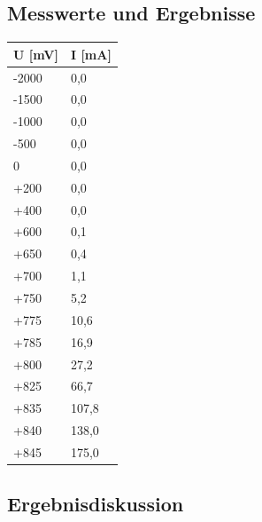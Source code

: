 \documentclass{scrartcl}
\begin{document}
\subsection{Messwerte und Ergebnisse}

\begin{table}[H]
\begin{center}
\begin{tabular}{l|l}
U [mV]   &   I [mA] \\
\hline
-2000   &     0,0 \\
-1500   &     0,0 \\
-1000   &     0,0 \\
-500    &     0,0 \\
    0   &     0,0 \\
+200    &     0,0 \\
+400    &     0,0 \\
+600    &     0,1 \\
+650    &     0,4 \\
+700    &     1,1 \\
+750    &     5,2 \\
+775    &    10,6 \\
+785    &    16,9 \\
+800    &    27,2 \\
+825    &    66,7 \\
+835    &   107,8 \\
+840    &   138,0 \\
+845    &   175,0
\end{tabular}
\end{center}
\label{tab:Diode}
\end{table}
\subsection{Ergebnisdiskussion}
\end{document}
